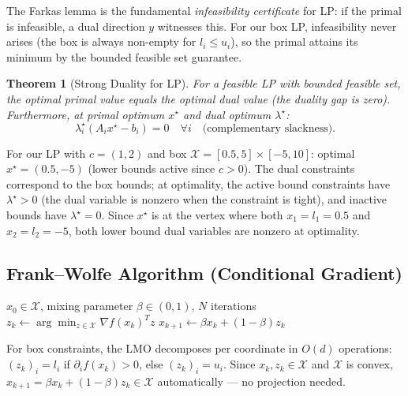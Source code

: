 \documentclass[11pt,a4paper]{article}
\newtheorem{theorem}{Theorem}[section]
\theoremstyle{definition}
\begin{document}
The Farkas lemma is the fundamental \emph{infeasibility certificate} for LP: if the primal is infeasible, a dual direction $y$ witnesses this. For our box LP, infeasibility never arises (the box is always non-empty for $l_i \leq u_i$), so the primal attains its minimum by the bounded feasible set guarantee.

\begin{theorem}[Strong Duality for LP]
For a feasible LP with bounded feasible set, the optimal primal value equals the optimal dual value (the duality gap is zero). Furthermore, at primal optimum $x^{\star}$ and dual optimum $\lambda^{\star}$:
\begin{equation}
\lambda^{\star}_i (A_i x^{\star} - b_i) = 0 \quad \forall i \quad \text{(complementary slackness)}.
\end{equation}
\end{theorem}

For our LP with $c = (1, 2)$ and box $\mathcal{X} = [0.5, 5] \times [-5, 10]$: optimal $x^{\star} = (0.5, -5)$ (lower bounds active since $c > 0$). The dual constraints correspond to the box bounds; at optimality, the active bound constraints have $\lambda^{\star} > 0$ (the dual variable is nonzero when the constraint is tight), and inactive bounds have $\lambda^{\star} = 0$. Since $x^{\star}$ is at the vertex where both $x_1 = l_1 = 0.5$ and $x_2 = l_2 = -5$, both lower bound dual variables are nonzero at optimality.

\subsection{Frank--Wolfe Algorithm (Conditional Gradient)}

\begin{algorithm}[H]
\caption{Frank--Wolfe / Conditional Gradient}
\label{alg:fw}
\begin{algorithmic}[1]
\Require $x_0 \in \mathcal{X}$, mixing parameter $\beta \in (0,1)$, $N$ iterations
    \State $z_k \gets \arg\min_{z \in \mathcal{X}} \nabla f(x_k)^T z$ 
    \State $x_{k+1} \gets \beta x_k + (1-\beta) z_k$ 
\EndFor
\end{algorithmic}
\end{algorithm}

For box constraints, the LMO decomposes per coordinate in $O(d)$ operations:
$(z_k)_i = l_i$ if $\partial_i f(x_k) > 0$, else $(z_k)_i = u_i$. Since $x_k, z_k \in \mathcal{X}$ and $\mathcal{X}$ is convex, $x_{k+1} = \beta x_k + (1-\beta) z_k \in \mathcal{X}$ automatically --- no projection needed.
\end{document}
